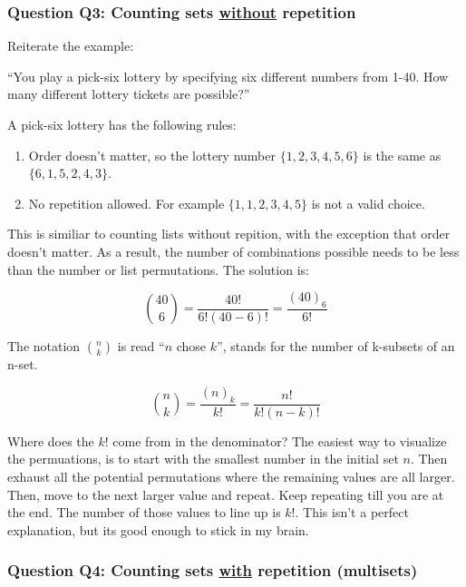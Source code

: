 \documentclass{article}
\begin{document}
\subsubsection{Question Q3: Counting sets \underline{without} repetition}

Reiterate the example:

\begin{center}
``You play a pick-six lottery by specifying six different numbers from 1-40. How many different lottery tickets are possible?''
\end{center}

A pick-six lottery has the following rules:
\begin{enumerate}
    \item Order doesn't matter, so the lottery number $\{1, 2, 3, 4, 5, 6\}$ is the same as $\{6, 1, 5, 2, 4, 3\}$.
    \item No repetition allowed. For example $\{1, 1, 2, 3, 4, 5\}$ is not a valid choice.
\end{enumerate}

This is similiar to counting lists without repition, with the exception that order doesn't matter. As a result, the number of combinations possible needs to be less than the number or list permutations. The solution is:

\begin{equation*}
    \binom{40}{6} = \dfrac{40!}{6!(40-6)!} = \dfrac{(40)_6}{6!}
\end{equation*}

The notation $\binom{n}{k}$ is read ``$n$ chose $k$'', stands for the number of k-subsets of an n-set.

\begin{equation*}
    \binom{n}{k} = \dfrac{(n)_k}{k!} = \dfrac{n!}{k!(n-k)!}
\end{equation*}

Where does the $k!$ come from in the denominator? The easiest way to visualize the permuations, is to start with the smallest number in the initial set $n$. Then exhaust all the potential permutations where the remaining values are all larger. Then, move to the next larger value and repeat. Keep repeating till you are at the end. The number of those values to line up is $k!$. This isn't a perfect explanation, but its good enough to stick in my brain.

\subsubsection{Question Q4: Counting sets \underline{with} repetition (multisets)}
\end{document}
